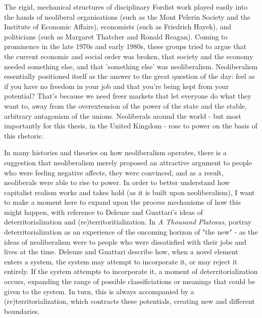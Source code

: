 The rigid, mechanical structures of disciplinary Fordist work played
easily into the hands of neoliberal organisations (such as the Mont Pelerin Society and the Institute of Economic Affairs), economists (such as Friedrich Hayek), and politicians (such as Margaret Thatcher and Ronald Reagan). Coming to prominence in the late 1970s and early 1980s, these groups tried to argue that the current economic and social order was broken, that society and the economy needed something else, and that 'something else' was neoliberalism. Neoliberalism essentially positioned itself as the answer to the great question of the day: feel as if you have no freedom in your job and that you're being
kept from your potential? That's because we need freer markets that let
everyone do what they want to, away from the overextension of the
power of the state and the stable, arbitrary antagonism of the unions.
Neoliberals around the world - but most importantly for this thesis, in the United Kingdom - rose to power on the basis of this rhetoric.

In many histories and theories on how neoliberalism operates, there is a suggestion that neoliberalism merely proposed an attractive argument to people who were feeling negative affects, they were convinced, and as a result, neoliberals were able to rise to power. In order to better understand how capitalist realism works and takes hold (as it is built upon neoliberalism), I want to make a moment here to  expand upon the process mechanisms of how this might happen,  with reference to Deleuze and Guattari's ideas of deterritorialization and (re)territoritialization. In \emph{A Thousand Plateaus}, \citet{deleuze_thousand_1987} portray deterritorialization as an experience of the oncoming horizon of "the new" - as the ideas of neoliberalism were to people who were dissatisfied with their jobs and lives at the time. Deleuze and Guattari describe how, when a novel element enters a system, the system may attempt to incorporate it, or may reject it entirely. If the system attempts to incorporate it, a moment of deterritorialization occurs, expanding the range of possible classificiations or meanings that could be given to the system. In turn, this is always accompanied by a (re)territorialization, which contracts these potentials, creating new and different boundaries. 

